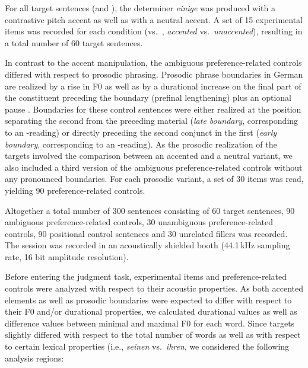 \documentclass[fleqn,reqno,10pt]{article}
\newcommand{\as}{\acro{as}}
\renewcommand{\es}{\acro{es}}
\newcommand{\lc}{\acro{lc}}
\newcommand{\ec}{\acro{ec}}
\begin{document}
For all target sentences (\as and \es), the determiner \emph{einige} was
produced with a contrastive pitch accent as well as with a neutral
accent. %
A set of 15 
experimental items was recorded for each condition (\as vs.~\es, \emph{accented} 
vs.~\emph{unaccented}), resulting in a total number of 60 target sentences.

In contrast to the accent manipulation, the ambiguous
preference-related controls differed with respect to prosodic
phrasing. Prosodic phrase boundaries in German are realized by a rise
in F0 as well as by a durational increase on the final part of the
constituent preceding the boundary (prefinal lengthening) plus an
optional pause \citep[e.g.][]{Vaissiere83,Fery93}.  Boundaries for
these control sentences were either realized at the position
separating the second  from the preceding material
(\emph{late boundary}, corresponding to an \ec-reading) or directly
preceding the second conjunct in the first  (\emph{early
  boundary}, corresponding to an \lc-reading). As the prosodic
realization of the targets involved the comparison between an accented
and a neutral variant, we also included a third version of the
ambiguous preference-related controls without any pronounced
boundaries. For each prosodic variant, a set of 30 items was read,
yielding 90 preference-related controls.

Altogether a total number of 300 sentences consisting of 60 target
sentences, 90 ambiguous preference-related controls, 30 unambiguous
preference-related controls, 90 positional control sentences and 30
unrelated fillers was recorded. The session was recorded in an
acoustically shielded booth (44.1\,kHz sampling rate, 16 bit amplitude
resolution).

Before entering the judgment task, experimental items and
preference-related controls were analyzed with respect to their acoustic
properties. As both accented elements as well as prosodic boundaries
were expected to differ with respect to their F0 and/or durational
properties, we calculated durational values as well as difference
values between minimal and maximal F0 for each word. Since targets
slightly differed with respect to the total number of words as well as
with respect to certain lexical properties (i.e., \emph{seinen}
vs.~\emph{ihren}, we considered the following analysis regions:
\end{document}
